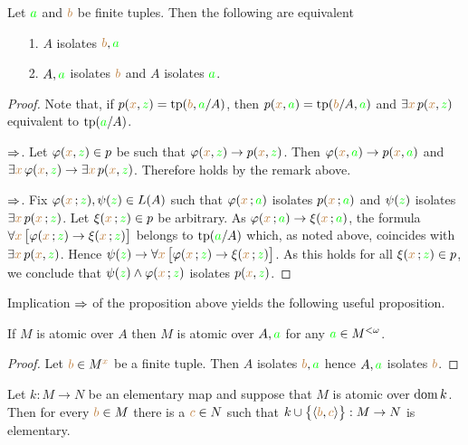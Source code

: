 \begin{proposition}
Let ${\color{green} a}$ and ${\color{brown} b}$ be finite tuples.
Then the following are equivalent
\begin{itemize}
\item[1.] $A$ isolates  ${\color{brown} b},{\color{green} a}$
\item[2.] $A,{\color{green} a}$ isolates ${\color{brown} b}$ and $A$ isolates ${\color{green} a}$.
\end{itemize}
\end{proposition}
\begin{proof}
Note that, if $p({\color{brown} x},{\color{green} z})={\rm tp} ({\color{brown} b},{\color{green} a}/A)$, then $p({\color{brown} x},{\color{green} a})={\rm tp}({\color{brown} b}/A,{\color{green} a})$ and $\exists{\color{brown}x}\,p({\color{brown} x},{\color{green} z})$ equivalent to ${\rm tp}({\color{green} a}/A)$.


$\Rightarrow$. Let $\varphi({\color{brown} x},{\color{green} z})\in p$ be such that $\varphi({\color{brown} x},{\color{green} z})\rightarrow p({\color{brown} x},{\color{green} z})$.
Then $\varphi({\color{brown} x},{\color{green} a})\rightarrow p({\color{brown} x},{\color{green} a})$ and $\exists{\color{brown}x}\, \varphi({\color{brown} x},{\color{green} z})\rightarrow \exists{\color{brown}x}\,p({\color{brown} x},{\color{green} z})$.
Therefore  holds by the remark above.

$\Rightarrow$. Fix $\varphi({\color{brown} x}\,;{\color{green} z}), \psi({\color{green} z})\in L(A)$ such that $\varphi({\color{brown} x}\,;{\color{green} a})$ isolates $p({\color{brown} x}\,;{\color{green} a})$ and $\psi({\color{green} z})$ isolates $\exists {\color{brown}x}\, p({\color{brown} x}\,;{\color{green} z})$.
Let $\xi({\color{brown} x}\,;{\color{green} z})\in p$ be arbitrary.
As $\varphi({\color{brown} x}\,;{\color{green} a})\rightarrow\xi({\color{brown} x}\,;{\color{green} a})$, the formula $\forall{\color{brown}x}\,\big[\varphi({\color{brown} x}\,;{\color{green} z})\rightarrow\xi({\color{brown} x}\,;{\color{green} z})\big]$ belongs to ${\rm tp}({\color{green} a}/A)$ which, as noted above, coincides with $\exists {\color{brown}x}\, p({\color{brown} x},{\color{green} z})$.
Hence $\psi({\color{green} z})\rightarrow\forall{\color{brown}x}\,\big[\varphi({\color{brown} x}\,;{\color{green} z})\rightarrow\xi({\color{brown} x}\,;{\color{green} z})\big]$.
As this holds for all $\xi({\color{brown} x}\,;{\color{green} z})\in p$, we conclude that $\psi({\color{green} z})\wedge\varphi({\color{brown} x}\,;{\color{green} z})$ isolates  $p({\color{brown} x},{\color{green} z})$.
\end{proof}

Implication $\Rightarrow$ of the proposition above yields the following useful proposition.

\begin{proposition}\label{prop_atomic_over_Aa}
If $M$ is atomic over $A$ then $M$ is atomic over $A,{\color{green} a}$ for any ${\color{green} a}\in M^{<\omega}$.
\end{proposition}
\begin{proof}
Let ${\color{brown} b}\in M^{\color{brown} x}$ be a finite tuple.
Then $A$ isolates ${\color{brown} b},{\color{green} a}$  hence $A,{\color{green} a}$ isolates ${\color{brown} b}$.
\end{proof}

\begin{proposition}\label{prop_atomic_extension}
Let $k:M\to N$ be an elementary map and suppose that $M$ is atomic over $\mathop{\rm dom} k$.
Then for every ${\color{brown} b}\in M$ there is a ${\color{brown} c}\in N$ such that $k\cup\big\{\langle{\color{brown}b},{\color{brown} c}\rangle\big\}:M\to N$ is elementary.
\end{proposition}

